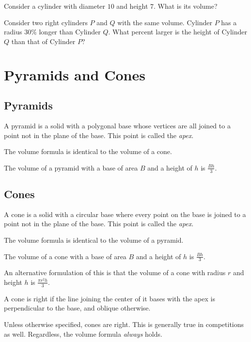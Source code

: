 \documentclass[mast]{lucky}
\begin{document}
\begin{exer}
Consider a cylinder with diameter $10$ and height $7.$ What is its volume?
\end{exer}
\begin{exer}
Consider two right cylinders $P$ and $Q$ with the same volume. Cylinder $P$ has a radius $30\%$ longer than Cylinder $Q.$ What percent larger is the height of Cylinder $Q$ than that of Cylinder $P?$
\end{exer}


\section{Pyramids and Cones}

\subsection{Pyramids}
\begin{defi}[Pyramid]
A pyramid is a solid with a polygonal base whose vertices are all joined to a point not in the plane of the base. This point is called the \textit{apex}.
\end{defi}

The volume formula is identical to the volume of a cone.

\begin{theo}
The volume of a pyramid with a base of area $B$ and a height of $h$ is $\frac{Bh}{3}.$
\end{theo}

\subsection{Cones}
\begin{defi}[Cone]
A cone is a solid with a circular base where every point on the base is joined to a point not in the plane of the base. This point is called the \textit{apex}.
\end{defi}

The volume formula is identical to the volume of a pyramid.

\begin{theo}
The volume of a cone with a base of area $B$ and a height of $h$ is $\frac{Bh}{3}.$
\end{theo}
An alternative formulation of this is that the volume of a cone with radius $r$ and height $h$ is $\frac{\pi r^2h}{3}.$

\begin{defi}
A cone is right if the line joining the center of it bases with the apex is perpendicular to the base, and oblique otherwise.
\end{defi}
Unless otherwise specified, cones are right. This is generally true in competitions as well. Regardless, the volume formula \textit{always} holds.
\end{document}
